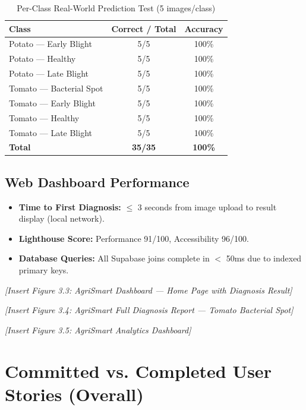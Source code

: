 \documentclass[12pt,a4paper]{report}
\begin{document}
\begin{table}[H]
\centering
\caption{Per-Class Real-World Prediction Test (5 images/class)}
\begin{tabular}{lcc}
\toprule
\textbf{Class} & \textbf{Correct / Total} & \textbf{Accuracy} \\
\midrule
Potato — Early Blight   & 5/5 & 100\% \\
Potato — Healthy        & 5/5 & 100\% \\
Potato — Late Blight    & 5/5 & 100\% \\
Tomato — Bacterial Spot & 5/5 & 100\% \\
Tomato — Early Blight   & 5/5 & 100\% \\
Tomato — Healthy        & 5/5 & 100\% \\
Tomato — Late Blight    & 5/5 & 100\% \\
\midrule
\textbf{Total} & \textbf{35/35} & \textbf{100\%} \\
\bottomrule
\end{tabular}
\end{table}

\subsection{Web Dashboard Performance}
\begin{itemize}
  \item \textbf{Time to First Diagnosis:} $\leq$ 3 seconds from image upload to result display (local network).
  \item \textbf{Lighthouse Score:} Performance 91/100, Accessibility 96/100.
  \item \textbf{Database Queries:} All Supabase joins complete in $<$ 50ms due to indexed primary keys.
\end{itemize}

\textit{[Insert Figure 3.3: AgriSmart Dashboard — Home Page with Diagnosis Result]}

\textit{[Insert Figure 3.4: AgriSmart Full Diagnosis Report — Tomato Bacterial Spot]}

\textit{[Insert Figure 3.5: AgriSmart Analytics Dashboard]}

\section{Committed vs. Completed User Stories (Overall)}
\end{document}
